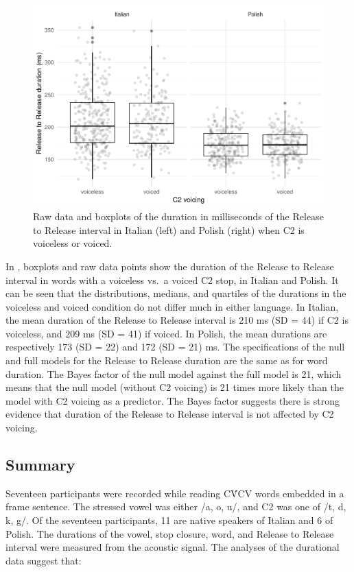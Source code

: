 \documentclass[12pt,]{article}
\begin{document}
\begin{figure}
\includegraphics[width=\linewidth]{2018-relrel_files/figure-latex/Figure5} \caption{Raw data and boxplots of the duration in milliseconds of the Release to Release interval in Italian (left) and Polish (right) when C2 is voiceless or voiced.}\label{f:Figure5}
\end{figure}

In , boxplots and raw data points show the duration of
the Release to Release interval in words with a voiceless vs.~a voiced
C2 stop, in Italian and Polish. It can be seen that the distributions,
medians, and quartiles of the durations in the voiceless and voiced
condition do not differ much in either language. In Italian, the mean
duration of the Release to Release interval is 210 ms (SD = 44) if C2 is
voiceless, and 209 ms (SD = 41) if voiced. In Polish, the mean durations
are respectively 173 (SD = 22) and 172 (SD = 21) ms. The specifications
of the null and full models for the Release to Release duration are the
same as for word duration. The Bayes factor of the null model against
the full model is 21, which means that the null model (without C2
voicing) is 21 times more likely than the model with C2 voicing as a
predictor. The Bayes factor suggests there is strong evidence that
duration of the Release to Release interval is not affected by C2
voicing.

\hypertarget{summary}{%
\subsection{Summary}\label{summary}}

Seventeen participants were recorded while reading CV́CV words embedded
in a frame sentence. The stressed vowel was either /a, o, u/, and C2 was
one of /t, d, k, g/. Of the seventeen participants, 11 are native
speakers of Italian and 6 of Polish. The durations of the vowel, stop
closure, word, and Release to Release interval were measured from the
acoustic signal. The analyses of the durational data suggest that:
\end{document}
